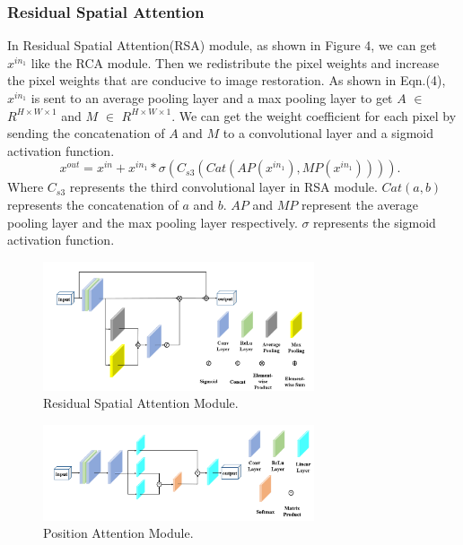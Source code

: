\begin{sloppypar}
\subsubsection{Residual Spatial  Attention}
In Residual Spatial Attention(RSA) module, as shown in Figure 4, we can get $x^{in_1}$ like the RCA module. Then we redistribute the pixel weights and increase the pixel weights that are conducive to image restoration. As shown in Eqn.(4), $x^{in_1}$ is sent to an average pooling layer and a max pooling layer to get $A$ $\in$ $R^{H \times W \times 1}$ and $M$ $\in$ $R^{H \times W \times 1}$. We can get the weight coefficient for each pixel by sending the concatenation of $A$ and $M$ to a convolutional layer and a sigmoid activation function.
\begin{equation}
	    x^{out}  =  x^{in} + x^{in_1} * \sigma(C_{s3}(Cat(AP(x^{in_1}), MP(x^{in_1})))). \enspace
\end{equation}
Where $C_{s3}$ represents the third convolutional layer in RSA module. $Cat(a,b)$ represents the concatenation of $a$ and $b$. $AP$ and $MP$ represent the average pooling layer and the max pooling layer respectively. $\sigma$ represents the sigmoid activation function.
\begin{figure}[h]
\centering
\includegraphics[width=8cm]{images/fig5.png}
\caption{Residual Spatial Attention Module.}
\label{fig_sim}
\end{figure}
\begin{figure}[h]
\centering
\includegraphics[width=8cm]{images/fig6.png}
\caption{Position Attention Module.}
\label{fig_sim}
\end{figure}

\end{sloppypar}
